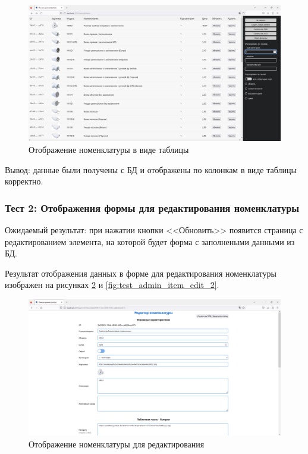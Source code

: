\begin{figure}[!htb]\centering

    \includegraphics[width=18cm]
    {images/mobile/admin/tests/view_items.png}

    \caption{Отображение номенклатуры в виде таблицы}
    \label{fig:test_admin_view}
\end{figure}

Вывод: данные были получены с БД и отображены по колонкам в виде таблицы корректно.

\subsubsection*{Тест 2: Отображения формы для редактирования номенклатуры}

Ожидаемый результат: при нажатии кнопки <<Обновить>> появится страница с редактированием элемента,
на которой будет форма с заполнеными данными из БД.

Результат отображения данных в форме для редактирования номенклатуры изображен на рисунках \ref{fig:test_admin_item_edit_1} и \ref{fig:test_admin_item_edit_2}.

\begin{figure}[!htb]\centering

    \includegraphics[width=14cm]
    {images/mobile/admin/tests/item_edit_1.png}

    \caption{Отображение номенклатуры для редактирования}
    \label{fig:test_admin_item_edit_1}
\end{figure}


